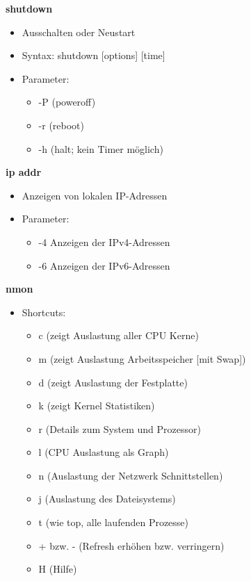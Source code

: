 \documentclass[12pt,utf8, 10pt]{article}
\begin{document}
\textbf{shutdown}
\begin{itemize}
	\item Ausschalten oder Neustart
	\item Syntax: shutdown [options] [time]
	\item Parameter:
	\begin{itemize}
		\item -P (poweroff)
		\item -r (reboot)
		\item -h (halt; kein Timer möglich)
	\end{itemize}
\end{itemize}

\textbf{ip addr}
\begin{itemize}
	\item Anzeigen von lokalen IP-Adressen
	\item Parameter:
	\begin{itemize}
		\item -4 Anzeigen der IPv4-Adressen
		\item -6 Anzeigen der IPv6-Adressen
	\end{itemize}
\end{itemize}

\textbf{nmon}
\begin{itemize}
	\item Shortcuts:
	\begin{itemize}
		\item c (zeigt Auslastung aller CPU Kerne)
		\item m (zeigt Auslastung Arbeitsspeicher [mit Swap])
		\item d (zeigt Auslastung der Festplatte)
		\item k (zeigt Kernel Statistiken)
		\item r (Details zum System und Prozessor)
		\item l (CPU Auslastung als Graph)
		\item n (Auslastung der Netzwerk Schnittstellen)
		\item j (Auslastung des Dateisystems)
		\item t (wie top, alle laufenden Prozesse)
		\item + bzw. - (Refresh erhöhen bzw. verringern)
		\item H (Hilfe)
	\end{itemize}
\end{itemize}
\end{document}
